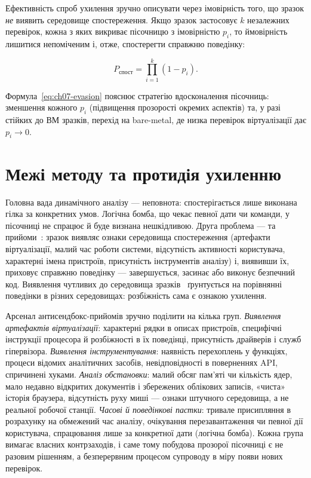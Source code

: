 Ефективність спроб ухилення зручно описувати через імовірність того, що зразок \emph{не} виявить середовище спостереження. Якщо зразок застосовує $k$ незалежних перевірок, кожна з яких викриває пісочницю з імовірністю $p_i$, то ймовірність лишитися непоміченим і, отже, спостерегти справжню поведінку:

\begin{equation}
P_{\text{спост}} = \prod_{i=1}^{k} (1 - p_i).
\label{eq:ch07-evasion}
\end{equation}

Формула~\eqref{eq:ch07-evasion} пояснює стратегію вдосконалення пісочниць: зменшення кожного $p_i$ (підвищення прозорості окремих аспектів) та, у разі стійких до ВМ зразків, перехід на bare-metal, де низка перевірок віртуалізації дає $p_i \to 0$.

\section{Межі методу та протидія ухиленню}\label{sec:ch07-limits}

Головна вада динамічного аналізу --- неповнота: спостерігається лише виконана гілка за конкретних умов. Логічна бомба, що чекає певної дати чи команди, у пісочниці не спрацює й буде визнана нешкідливою. Друга проблема ---  та  прийоми~\cite{ch07:chen,ch07:lindorfer}: зразок виявляє ознаки середовища спостереження (артефакти віртуалізації, малий час роботи системи, відсутність активності користувача, характерні імена пристроїв, присутність інструментів аналізу) і, виявивши їх, приховує справжню поведінку --- завершується, засинає або виконує безпечний код. Виявлення чутливих до середовища зразків~\cite{ch07:lindorfer} ґрунтується на порівнянні поведінки в різних середовищах: розбіжність сама є ознакою ухилення.

Арсенал антисендбокс-прийомів зручно поділити на кілька груп. \emph{Виявлення артефактів віртуалізації}: характерні рядки в описах пристроїв, специфічні інструкції процесора й розбіжності в їх поведінці, присутність драйверів і служб гіпервізора. \emph{Виявлення інструментування}: наявність перехоплень у функціях, процеси відомих аналітичних засобів, невідповідності в поверненнях API, спричинені хуками. \emph{Аналіз обстановки}: малий обсяг пам'яті чи кількість ядер, мало недавно відкритих документів і збережених облікових записів, «чиста» історія браузера, відсутність руху миші --- ознаки штучного середовища, а не реальної робочої станції. \emph{Часові й поведінкові пастки}: тривале присипляння в розрахунку на обмежений час аналізу, очікування перезавантаження чи певної дії користувача, спрацювання лише за конкретної дати (логічна бомба). Кожна група вимагає власних контрзаходів, і саме тому побудова прозорої пісочниці є не разовим рішенням, а безперервним процесом супроводу в міру появи нових перевірок.

